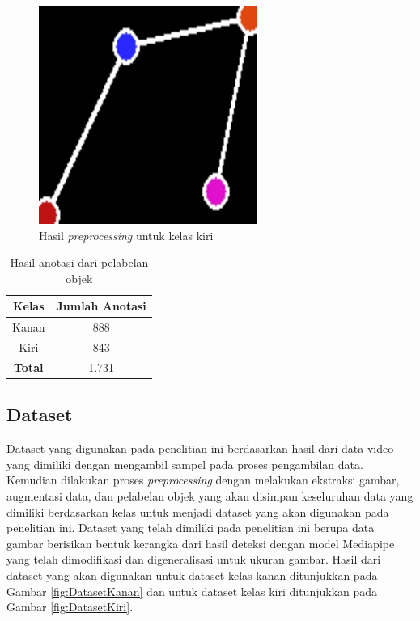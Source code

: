 \begin{figure}[H]
  \centering
  \includegraphics[scale=0.8]{gambar/dataset kiri.png}
  \caption{Hasil \emph{preprocessing} untuk kelas kiri}
  \label{fig:KelasKiri}
\end{figure}

\begin{longtable}{|c|c|}
  \caption{Hasil anotasi dari pelabelan objek}
  \label{tb:HasilAnotasi}  \\
  \hline
  \rowcolor[HTML]{C0C0C0}
  \textbf{Kelas} & \textbf{Jumlah Anotasi}  \\
  \hline
  Kanan           & 888    \\
  \hline
  Kiri            & 843    \\
  \hline
  \textbf{Total}  & 1.731  \\
  \hline
\end{longtable}


\subsection{Dataset}
\label{subsec:Dataset}

Dataset yang digunakan pada penelitian ini berdasarkan hasil dari data video yang dimiliki dengan mengambil sampel pada proses pengambilan data. Kemudian dilakukan proses \emph{preprocessing} dengan melakukan ekstraksi gambar, augmentasi data, dan pelabelan objek yang akan disimpan keseluruhan data yang dimiliki berdasarkan kelas untuk menjadi dataset yang akan digunakan pada penelitian ini. Dataset yang telah dimiliki pada penelitian ini berupa data gambar berisikan bentuk kerangka dari hasil deteksi dengan model Mediapipe yang telah dimodifikasi dan digeneralisasi untuk ukuran gambar. Hasil dari dataset yang akan digunakan untuk dataset kelas kanan ditunjukkan pada Gambar \ref{fig:DatasetKanan} dan untuk dataset kelas kiri ditunjukkan pada Gambar \ref{fig:DatasetKiri}.

